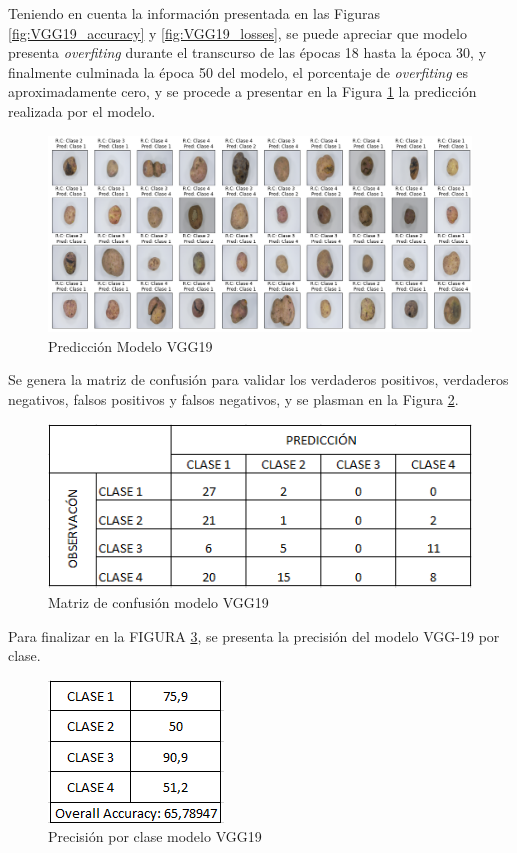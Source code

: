 			Teniendo en cuenta la información presentada en las Figuras \ref{fig:VGG19_accuracy} y \ref{fig:VGG19_losses}, se puede apreciar que modelo presenta \textit{overfiting} durante el transcurso de las épocas 18 hasta la época 30, y finalmente culminada la época 50 del modelo, el porcentaje de \textit{overfiting} es aproximadamente cero, y se procede a presentar en la Figura \ref*{fig:VGG19_prediccion} la predicción realizada por el modelo.
			
			\begin{figure}[ht]
				\centering
				\includegraphics[scale=0.35]{Figs/103.png}
				\caption{Predicción Modelo VGG19}
				\label{fig:VGG19_prediccion}
			\end{figure}
		
			Se genera la matriz de confusión para validar los verdaderos positivos, verdaderos negativos, falsos positivos y falsos negativos, y se plasman en la Figura \ref{fig:MC_VGG19}.
		
			\begin{figure}[ht]
				\centering
				\includegraphics[scale=0.5]{Figs/131.png}
				\caption{Matriz de confusión modelo VGG19}
				\label{fig:MC_VGG19}
			\end{figure}
			
			Para finalizar en la FIGURA \ref{fig:ACU_VGG19}, se presenta la precisión del modelo VGG-19 por clase.
		
			\begin{figure}[ht]
				\centering
				\includegraphics[scale=0.6]{Figs/132.png}
				\caption{Precisión por clase modelo VGG19}
				\label{fig:ACU_VGG19}
			\end{figure}
		
